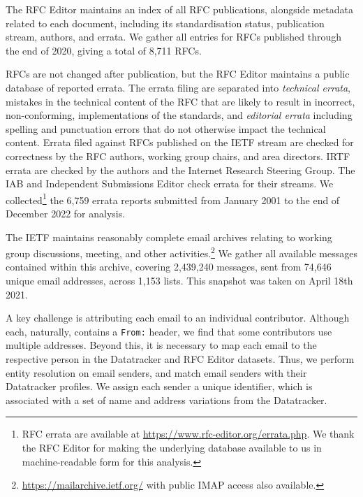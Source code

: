 \documentclass[twocolumn,10pt]{article}
\newcommand{\pb}[1]{\vspace{0.75ex}\noindent{\textbf{#1}}}
\begin{document}
\pb{RFC Editor:}
The RFC Editor maintains an index of all RFC publications, alongside
metadata related to each document, including its standardisation status,
publication stream, authors, and errata. We gather all entries for RFCs
published through the end of 2020, giving a total of 8,711 RFCs.

RFCs are not changed after publication, but the RFC Editor maintains a
public database of reported errata. The errata filing are separated into
\emph{technical errata}, mistakes in the technical content of the RFC that
are likely to result in incorrect, non-conforming, implementations of the
standards, and \emph{editorial errata} including spelling and punctuation
errors that do not otherwise impact the technical content.
Errata filed against RFCs published on the IETF stream are checked for
correctness by the RFC authors, working group chairs, and area directors.
IRTF errata are checked by the authors and the Internet Research Steering
Group. The IAB and Independent Submissions Editor check errata for their
streams. We collected\footnote{RFC errata are available at
\url{https://www.rfc-editor.org/errata.php}. We thank the RFC Editor for
making the underlying database available to us in machine-readable form for
this analysis.} the 6,759 errata reports submitted from January 2001 to the
end of December 2022 for analysis.

\pb{Email archives and entity resolution:}
The IETF maintains reasonably complete email archives relating to working
group discussions, meeting, and other activities.\footnote{\url{https://mailarchive.ietf.org/}
with public IMAP access also available.} We gather all available messages
contained within this archive, covering 2,439,240 messages, sent from
74,646 unique email addresses, across 1,153 lists. This snapshot was taken
on April 18th 2021.

A key challenge is attributing each email to an individual contributor.
Although each, naturally, contains a \texttt{From:} header, we find that some
contributors use multiple addresses. Beyond this, it is necessary to map
each email to the respective person in the Datatracker and RFC Editor
datasets.  Thus, we perform entity resolution on email senders, and match
email senders with their Datatracker profiles. We assign each sender a
unique identifier, which is associated with a set of name and address
variations from the Datatracker. 
\end{document}
